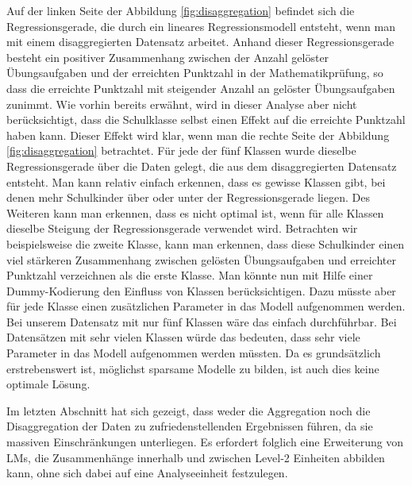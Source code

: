 \documentclass[12pt, a4paper]{article}\usepackage[]{graphicx}\usepackage[]{color}
\begin{document}
Auf der linken Seite der Abbildung \ref{fig:disaggregation} befindet sich die Regressionsgerade, die durch ein lineares Regressionsmodell entsteht, wenn man mit einem disaggregierten Datensatz arbeitet. Anhand dieser Regressionsgerade besteht ein positiver Zusammenhang zwischen der Anzahl gelöster Übungsaufgaben und der erreichten Punktzahl in der Mathematikprüfung, so dass die erreichte Punktzahl mit steigender Anzahl an gelöster Übungsaufgaben zunimmt. Wie vorhin bereits erwähnt, wird in dieser Analyse aber nicht berücksichtigt, dass die Schulklasse selbst einen Effekt auf die erreichte Punktzahl haben kann. Dieser Effekt wird klar, wenn man die rechte Seite der Abbildung \ref{fig:disaggregation} betrachtet. Für jede der fünf Klassen wurde dieselbe Regressionsgerade über die Daten gelegt, die aus dem disaggregierten Datensatz entsteht. Man kann relativ einfach erkennen, dass es gewisse Klassen gibt, bei denen mehr Schulkinder über oder unter der Regressionsgerade liegen. Des Weiteren kann man erkennen, dass es nicht optimal ist, wenn für alle Klassen dieselbe Steigung der Regressionsgerade verwendet wird. Betrachten wir beispielsweise die zweite Klasse, kann man erkennen, dass diese Schulkinder einen viel stärkeren Zusammenhang zwischen gelösten Übungsaufgaben und erreichter Punktzahl verzeichnen als die erste Klasse. Man könnte nun mit Hilfe einer Dummy-Kodierung den Einfluss von Klassen berücksichtigen. Dazu müsste aber für jede Klasse einen zusätzlichen Parameter in das Modell aufgenommen werden. Bei unserem Datensatz mit nur fünf Klassen wäre das einfach durchführbar. Bei Datensätzen mit sehr vielen Klassen würde das bedeuten, dass sehr viele Parameter in das Modell aufgenommen werden müssten. Da es grundsätzlich erstrebenswert ist, möglichst sparsame Modelle zu bilden, ist auch dies keine optimale Lösung. 

Im letzten Abschnitt hat sich gezeigt, dass weder die Aggregation noch die Disaggregation der Daten zu zufriedenstellenden Ergebnissen führen, da sie massiven Einschränkungen unterliegen. Es erfordert folglich eine Erweiterung von LMs, die Zusammenhänge innerhalb und zwischen Level-2 Einheiten abbilden kann, ohne sich dabei auf eine Analyseeinheit festzulegen.
\end{document}
